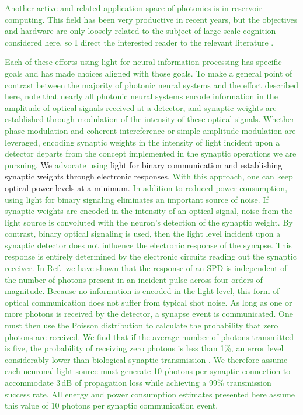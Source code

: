 \documentclass[twocolumn]{article}
\newcommand{\onlinecite}[1]{\hspace{-1 ex} \nocite{#1}\citenum{#1}}
\begin{document}
\textcolor{ForestGreen}{Another active and related application space of photonics is in reservoir computing. This field has been very productive in recent years, but the objectives and hardware are only loosely related to the subject of large-scale cognition considered here, so I direct the interested reader to the relevant literature \cite{funa1993,vada2011,orso2015,vabr2017,brpe2018}.} 

\textcolor{ForestGreen}{Each of these efforts using light for neural information processing has specific goals and has made choices aligned with those goals. To make a general point of contrast between the majority of photonic neural systems and the effort described here, note that nearly all photonic neural systems encode information in the amplitude of optical signals received at a detector, and synaptic weights are established through modulation of the intensity of these optical signals. Whether phase modulation and coherent intereference or simple amplitude modulation are leveraged, encoding synaptic weights in the intensity of light incident upon a detector departs from the concept implemented in the synaptic operations we are pursuing.} We \textcolor{ForestGreen}{advocate using} light for binary communication and establishing synaptic weights through electronic responses. \textcolor{ForestGreen}{With this approach, one can keep} optical power levels at a minimum. \textcolor{ForestGreen}{In addition to reduced power consumption, using light for binary signaling eliminates an important source of noise. If synaptic weights are encoded in the intensity of an optical signal, noise from the light source is convoluted with the neuron's detection of the synaptic weight. By contrast, binary optical signaling is used, then the light level incident upon a synaptic detector does not influence the electronic response of the synapse. This response is entirely determined by the electronic circuits reading out the synaptic receiver. In Ref.\,\onlinecite{buta2020_2} we have shown that the response of an SPD is independent of the number of photons present in an incident pulse across four orders of magnitude. Because no information is encoded in the light level, this form of optical communication does not suffer from typical shot noise. As long as one or more photons is received by the detector, a synapse event is communicated. One must then use the Poisson distribution to calculate the probability that zero photons are received. We find that if the average number of photons transmitted is five, the probability of receiving zero photons is less than 1\%, an error level considerably lower than biological synaptic transmission \cite{li1997}. We therefore assume each neuronal light source must generate 10 photons per synaptic connection to accommodate 3\,dB of propagation loss while achieving a 99\% transmission success rate. All energy and power consumption estimates presented here assume this value of 10 photons per synaptic communication event.}
\end{document}
